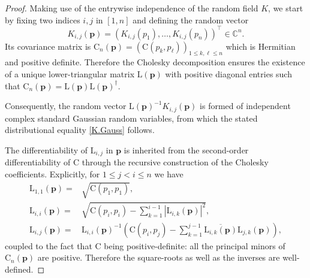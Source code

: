 \documentclass[pdflatex,sn-mathphys-num]{sn-jnl}
\theoremstyle{thmstyleone}
\numberwithin{equation}{section}
\newcommand{\C}{\mathbb{C}}
\newcommand{\Cc}{\mathrm{C}}
\begin{document}
\begin{proof}
    Making use of the entrywise independence of the random field $K$, we start by fixing two indices $i,j$ in $[1,n]$ and defining the random vector
    \begin{equation*}
        K_{i,j}(\mathbf{p})=(K_{i,j}(p_{1}),\ldots,K_{i,j}(p_{n}))^{\top}\in\C^{n}.
    \end{equation*}
    Its covariance matrix is $\Cc_{n}(\mathbf{p})=(\Cc(p_{k},p_{\ell}))_{1\leq k,\ell\leq n}$ which is Hermitian and positive definite. Therefore the Cholesky decomposition ensures the existence of a unique lower-triangular matrix $\mathrm{L}(\mathbf{p})$ with positive diagonal entries such that $\Cc_{n}(\mathbf{p})=\mathrm{L}(\mathbf{p})\mathrm{L}(\mathbf{p})^{\dagger}$.


    Consequently, the random vector $\mathrm{L}(\mathbf{p})^{-1}K_{i,j}(\mathbf{p})$ is formed of independent complex standard Gaussian random variables, from which the stated distributional equality \eqref{K.Gauss} follows.


    The differentiability of $\mathrm{L}_{i,j}$ in $\mathbf{p}$ is inherited from the second-order differentiability of $\Cc$ through the recursive construction of the Cholesky coefficients. Explicitly, for $1\leq j<i\leq n$ we have
    \begin{equation}\label{L.constr}
    \begin{split}
        \mathrm{L}_{1,1}(\mathbf{p})=&\sqrt{\Cc(p_1,p_1)},\\
        \mathrm{L}_{i,i}(\mathbf{p})=&\sqrt{\Cc(p_{i},p_{i})-\sum_{k=1}^{i-1}|\mathrm{L}_{i,k}(\mathbf{p})|^2},\\
        \mathrm{L}_{i,j}(\mathbf{p})=&\mathrm{L}_{i,i}(\mathbf{p})^{-1}\left(\Cc(p_{i},p_{j})-\sum_{k=1}^{j-1}\overline{\mathrm{L}_{i,k}(\mathbf{p})}\mathrm{L}_{j,k}(\mathbf{p})\right),
    \end{split}
    \end{equation}
    coupled to the fact that $\Cc$ being positive-definite: all the principal minors of $\Cc_{n}(\mathbf{p})$ are positive. Therefore the square-roots as well as the inverses are well-defined.
\end{proof}
\end{document}
